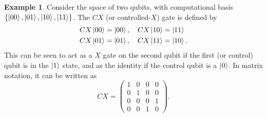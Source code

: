 \documentclass[12pt,a4paper]{report}
\numberwithin{equation}{section}
\theoremstyle{definition}
\theoremstyle{theorem}
\theoremstyle{theorem}
\theoremstyle{example}
\newtheorem{example}{Example}[section]
\theoremstyle{definition}
\begin{document}
\begin{example}
	Consider the space of two qubits, with computational basis $\{\ket{00},\ket{01},\ket{10},\ket{11}\}$. The $CX$ (or controlled-$X$) gate is defined by
	\begin{equation}
		\begin{aligned}
			CX\ket{00}&=\ket{00},\quad CX\ket{10}=\ket{11}\\
			CX\ket{01}&=\ket{01},\quad CX\ket{11}=\ket{10}.
		\end{aligned}
	\end{equation}
	This can be seen to act as a $X$ gate on the second qubit if the first (or control) qubit is in the $\ket{1}$ state, and as the identity if the control qubit is a $\ket{0}$. In matrix notation, it can be written as
	\begin{equation}
		CX=\begin{pmatrix}
			1&0&0&0\\0&1&0&0\\0&0&0&1\\0&0&1&0
		\end{pmatrix}.
	\end{equation}
\end{example}
\end{document}
